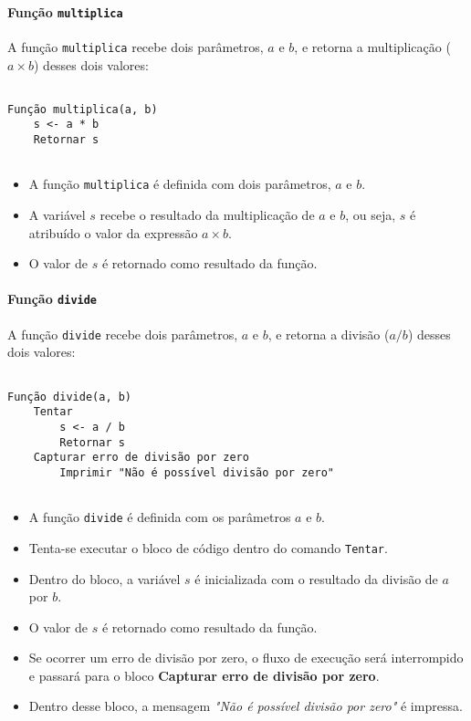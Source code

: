 \documentclass[a4paper, 12pt, onecolumn,singlespacing]{article}
\begin{document}
\paragraph{Função \texttt{multiplica}} A função \texttt{multiplica} recebe dois parâmetros, $a$ e $b$, e retorna a multiplicação ($a \times b$) desses dois valores:


\begin{verbatim}
	
Função multiplica(a, b)
	s <- a * b
	Retornar s
	
\end{verbatim}

\begin{itemize}
	\item A função \texttt{multiplica} é definida com dois parâmetros, $a$ e $b$.
	\item A variável $s$ recebe o resultado da multiplicação de $a$ e $b$, ou seja, $s$ é atribuído o valor da expressão $a \times b$.
	\item O valor de $s$ é retornado como resultado da função.
\end{itemize}

\paragraph{Função \texttt{divide}} A função \texttt{divide} recebe dois parâmetros, $a$ e $b$, e retorna a divisão ($a/b$) desses dois valores:

\begin{verbatim}
	
Função divide(a, b)
	Tentar
		s <- a / b
		Retornar s
	Capturar erro de divisão por zero
		Imprimir "Não é possível divisão por zero"
	
\end{verbatim}

\begin{itemize}
	\item A função \texttt{divide} é definida com os parâmetros $a$ e $b$.
	\item Tenta-se executar o bloco de código dentro do comando \texttt{Tentar}.
	\item Dentro do bloco, a variável $s$ é inicializada com o resultado da divisão de $a$ por $b$.
	\item O valor de $s$ é retornado como resultado da função.
	\item Se ocorrer um erro de divisão por zero, o fluxo de execução será interrompido e passará para o bloco \textbf{Capturar erro de divisão por zero}.
	\item Dentro desse bloco, a mensagem \textit{"Não é possível divisão por zero"} é impressa.
\end{itemize}
\end{document}

